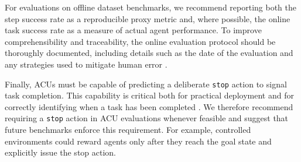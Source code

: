 For evaluations on offline dataset benchmarks, we recommend reporting both the step success rate as a reproducible proxy metric and, where possible, the online task success rate as a measure of actual agent performance. To improve comprehensibility and traceability, the online evaluation protocol should be thoroughly documented, including details such as the date of the evaluation and any strategies used to mitigate human error \citep{reason1990human}.

Finally, ACUs must be capable of predicting a deliberate \texttt{stop} action to signal task completion. This capability is critical both for practical deployment and for correctly identifying when a task has been completed . We therefore recommend requiring a \texttt{stop} action in ACU evaluations whenever feasible and suggest that future benchmarks enforce this requirement. For example, controlled environments could reward agents only after they reach the goal state and explicitly issue the stop action.
